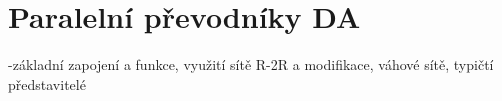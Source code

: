 \section{Paralelní převodníky DA}
-základní zapojení a funkce, využití sítě R-2R a modifikace, váhové sítě, typičtí představitelé
